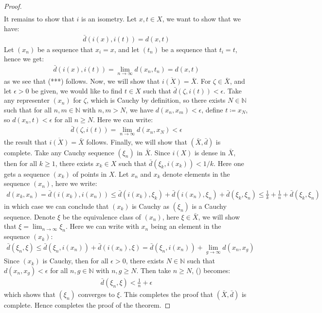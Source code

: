 \documentclass[11pt]{book}
\theoremstyle{break}
\theoremstyle{break}
\newcommand{\N}{\mathbb{N}}
\begin{document}
\begin{proof}
\begin{align*}
\end{align*}
It remains to show that $i$ is an isometry. Let $x,t \in X$, we want to show that we have:
\begin{align*}
\bar{d}(i(x), i(t)) = d(x,t) \tag{***}
\end{align*}
Let $(x_n)$ be a sequence that $x_i = x$, and let $(t_n)$ be a sequence that $t_i = t$, hence we get:
\begin{align*}
\bar{d}(i(x),i(t)) = \lim_{n\to \infty}d(x_n,t_n) = d(x,t)
\end{align*}
as we see that (***) follows. Now, we will show that $\overline{i(X)} = \bar{X}$. For $\zeta \in \bar{X}$, and let $\epsilon>0$ be given, we would like to find $t \in X$ such that $\bar{d}(\zeta, i(t)) < \epsilon$. Take any representer $(x_n)$ for $\zeta$, which is Cauchy by definition, so there exists $N \in \N$ such that for all $n,m \in \N$ with $n,m>N$, we have $d(x_n,x_m) < \epsilon$, define $t \coloneqq x_N$, so $d(x_n,t) < \epsilon$ for all $n \geq N$. Here we can write:
\begin{align*}
\bar{d}(\zeta, i(t)) = \lim_{n\to \infty}d(x_n,x_N) < \epsilon
\end{align*}
the result that $\overline{i(X)} = \bar{X}$ follows. Finally, we will show that $(\bar{X},\bar{d})$ is complete. Take any Cauchy sequence $(\xi_n)$ in $\bar{X}$. Since $i(X)$ is dense in $\bar{X}$, then for all $k \geq 1$, there exists $x_k \in X$ such that $\bar{d}(\xi_k,i(x_k)) < 1/k$. Here one gets a sequence $(x_k)$ of points in $X$. Let $x_n$ and $x_k$ denote elements in the sequence $(x_n)$, here we write:
\begin{align*}
d(x_k,x_n) = \bar{d}(i(x_k),i(x_n)) \leq \bar{d}(i(x_k),\xi_k) + \bar{d}(i(x_n),\xi_n) + \bar{d}(\xi_k,\xi_n)\leq \frac{1}{k} + \frac{1}{n} + \bar{d}(\xi_k,\xi_n)
\end{align*}
in which case we can conclude that $(x_k)$ is Cauchy as $(\xi_n)$ is a Cauchy sequence. Denote $\xi$ be the equivalence class of $(x_n)$, here $\xi \in \bar{X}$, we will show that $\xi = \lim_{n\to \infty}\xi_n$. Here we can write with $x_n$ being an element in the sequence $(x_k)$:
\begin{align*}
\bar{d}(\xi_n, \xi) \leq \bar{d}(\xi_n, i(x_n)) + \bar{d}(i(x_n), \xi) =  \bar{d}(\xi_n, i(x_n))  + \lim_{g \to \infty}d(x_n,x_g) \tag{\dag}
\end{align*}
Since $(x_k)$ is Cauchy, then for all $\epsilon >0$, there exists $N \in \N$ such that $d(x_n,x_g) < \epsilon$ for all $n,g\in \N$ with $n,g\geq N$. Then take $n \geq N$, (\dag) becomes:
\begin{align*}
\bar{d}(\xi_n, \xi) < \frac{1}{n} + \epsilon
\end{align*}
which shows that $(\xi_n)$ converges to $\xi$. This completes the proof that $(\bar{X}, \bar{d})$ is complete. Hence completes the proof of the theorem. 
\end{proof}
\end{document}

